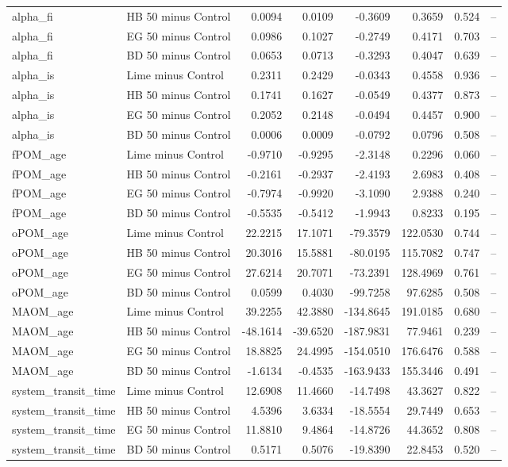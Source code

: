 \documentclass[preprint,12pt]{elsarticle}
\begin{document}
\begin{landscape}
\begin{longtable}{llrrrrrl}
alpha\_fi & HB 50 minus Control & 0.0094 & 0.0109 & -0.3609 & 0.3659 & 0.524 & -- \\
alpha\_fi & EG 50 minus Control & 0.0986 & 0.1027 & -0.2749 & 0.4171 & 0.703 & -- \\
alpha\_fi & BD 50 minus Control & 0.0653 & 0.0713 & -0.3293 & 0.4047 & 0.639 & -- \\
alpha\_is & Lime minus Control & 0.2311 & 0.2429 & -0.0343 & 0.4558 & 0.936 & -- \\
alpha\_is & HB 50 minus Control & 0.1741 & 0.1627 & -0.0549 & 0.4377 & 0.873 & -- \\
alpha\_is & EG 50 minus Control & 0.2052 & 0.2148 & -0.0494 & 0.4457 & 0.900 & -- \\
alpha\_is & BD 50 minus Control & 0.0006 & 0.0009 & -0.0792 & 0.0796 & 0.508 & -- \\
fPOM\_age & Lime minus Control & -0.9710 & -0.9295 & -2.3148 & 0.2296 & 0.060 & -- \\
fPOM\_age & HB 50 minus Control & -0.2161 & -0.2937 & -2.4193 & 2.6983 & 0.408 & -- \\
fPOM\_age & EG 50 minus Control & -0.7974 & -0.9920 & -3.1090 & 2.9388 & 0.240 & -- \\
fPOM\_age & BD 50 minus Control & -0.5535 & -0.5412 & -1.9943 & 0.8233 & 0.195 & -- \\
oPOM\_age & Lime minus Control & 22.2215 & 17.1071 & -79.3579 & 122.0530 & 0.744 & -- \\
oPOM\_age & HB 50 minus Control & 20.3016 & 15.5881 & -80.0195 & 115.7082 & 0.747 & -- \\
oPOM\_age & EG 50 minus Control & 27.6214 & 20.7071 & -73.2391 & 128.4969 & 0.761 & -- \\
oPOM\_age & BD 50 minus Control & 0.0599 & 0.4030 & -99.7258 & 97.6285 & 0.508 & -- \\
MAOM\_age & Lime minus Control & 39.2255 & 42.3880 & -134.8645 & 191.0185 & 0.680 & -- \\
MAOM\_age & HB 50 minus Control & -48.1614 & -39.6520 & -187.9831 & 77.9461 & 0.239 & -- \\
MAOM\_age & EG 50 minus Control & 18.8825 & 24.4995 & -154.0510 & 176.6476 & 0.588 & -- \\
MAOM\_age & BD 50 minus Control & -1.6134 & -0.4535 & -163.9433 & 155.3446 & 0.491 & -- \\
system\_transit\_time & Lime minus Control & 12.6908 & 11.4660 & -14.7498 & 43.3627 & 0.822 & -- \\
system\_transit\_time & HB 50 minus Control & 4.5396 & 3.6334 & -18.5554 & 29.7449 & 0.653 & -- \\
system\_transit\_time & EG 50 minus Control & 11.8810 & 9.4864 & -14.8726 & 44.3652 & 0.808 & -- \\
system\_transit\_time & BD 50 minus Control & 0.5171 & 0.5076 & -19.8390 & 22.8453 & 0.520 & -- \\
\end{longtable}


\end{landscape}
\end{document}
